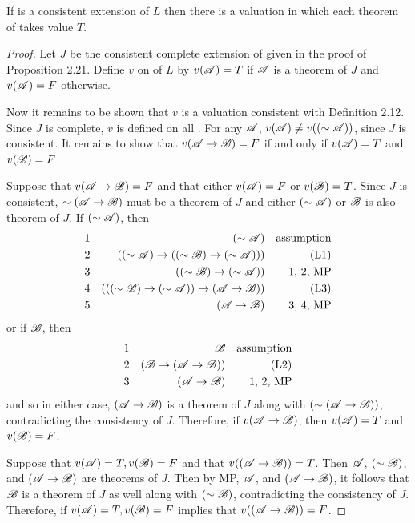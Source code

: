 \begin{proposition}
  If \Lext{} is a consistent extension of \(L\) then there is a valuation in which each theorem of \Lext{} takes value \(T\).

  \begin{proof}
    Let \(J\) be the consistent complete extension of \Lext{} given in the proof of Proposition 2.21. Define \(v\) on \wfs{} of \(L\) by \(v(\mathscr{A}) = T\) if \(\mathscr{A}\) is a theorem of \(J\) and \(v(\mathscr{A}) = F\) otherwise.

    Now it remains to be shown that \(v\) is a valuation consistent with Definition 2.12. Since \(J\) is complete, \(v\) is defined on all \wfs{}. For any \(\mathscr{A}\), \(v(\mathscr{A}) \neq v((\sim\mathscr{A}))\), since \(J\) is consistent. It remains to show that \(v(\mathscr{A} \rightarrow \mathscr{B}) = F\) if and only if \(v(\mathscr{A}) = T\) and \(v(\mathscr{B}) = F\).

    \Ra{} Suppose that \(v(\mathscr{A} \rightarrow \mathscr{B}) = F\) and that either \(v(\mathscr{A}) = F\) or \(v(\mathscr{B}) = T\). Since \(J\) is consistent, \(\sim(\mathscr{A} \rightarrow \mathscr{B})\) must be a theorem of \(J\) and either \((\sim\mathscr{A})\) or \(\mathscr{B}\) is also theorem of \(J\). If \((\sim\mathscr{A})\), then
    \begin{align*}
      \text{1}&&
      (\sim\mathscr{A})&&
      \text{assumption}\\
      \text{2}&&
      ((\sim\mathscr{A}) \rightarrow ((\sim\mathscr{B}) \rightarrow (\sim\mathscr{A})))&&
      \text{(L1)}\\
      \text{3}&&
      ((\sim\mathscr{B}) \rightarrow (\sim\mathscr{A}))&&
      \text{1, 2, MP}\\
      \text{4}&&
      (((\sim\mathscr{B}) \rightarrow (\sim\mathscr{A})) \rightarrow (\mathscr{A} \rightarrow \mathscr{B}))&&
      \text{(L3)}\\
      \text{5}&&
      (\mathscr{A} \rightarrow \mathscr{B})&&
      \text{3, 4, MP}
    \end{align*}
    or if \(\mathscr{B}\), then
    \begin{align*}
      \text{1}&&
      \mathscr{B}&&
      \text{assumption}\\
      \text{2}&&
      (\mathscr{B} \rightarrow (\mathscr{A} \rightarrow \mathscr{B}))&&
      \text{(L2)}\\
      \text{3}&&
      (\mathscr{A} \rightarrow \mathscr{B})&&
      \text{1, 2, MP}
    \end{align*}
    and so in either case, \((\mathscr{A} \rightarrow \mathscr{B})\) is a theorem of \(J\) along with \((\sim(\mathscr{A} \rightarrow \mathscr{B}))\), contradicting the consistency of \(J\). Therefore, if \(v(\mathscr{A} \rightarrow \mathscr{B})\), then \(v(\mathscr{A}) = T\) and \(v(\mathscr{B}) = F\).

    \La{} Suppose that \(v(\mathscr{A}) = T, v(\mathscr{B}) = F\) and that \(v((\mathscr{A} \rightarrow \mathscr{B})) = T\). Then \(\mathscr{A}\), \((\sim\mathscr{B})\), and \((\mathscr{A} \rightarrow \mathscr{B})\) are theorems of \(J\). Then by MP, \(\mathscr{A}\), and \((\mathscr{A} \rightarrow \mathscr{B})\), it follows that \(\mathscr{B}\) is a theorem of \(J\) as well along with \((\sim\mathscr{B})\), contradicting the consistency of \(J\). Therefore, if \(v(\mathscr{A}) = T, v(\mathscr{B}) = F\) implies that \(v((\mathscr{A} \rightarrow \mathscr{B})) = F\).


\end{proof}
\end{proposition}
